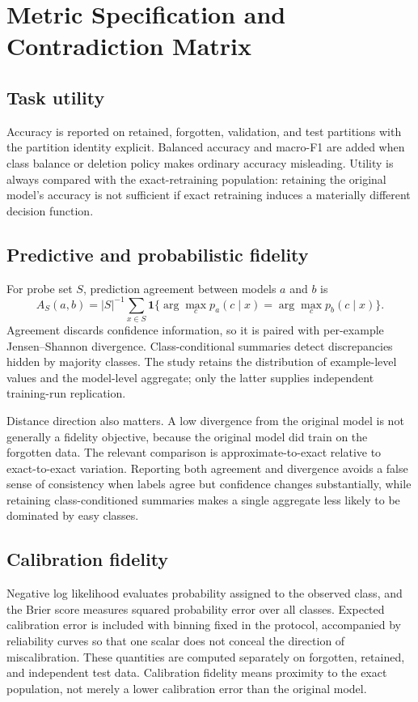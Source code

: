 \section{Metric Specification and Contradiction Matrix}
\subsection{Task utility}
Accuracy is reported on retained, forgotten, validation, and test partitions with the
partition identity explicit.  Balanced accuracy and macro-F1 are added when class balance
or deletion policy makes ordinary accuracy misleading.  Utility is always compared with
the exact-retraining population: retaining the original model's accuracy is not sufficient
if exact retraining induces a materially different decision function.

\subsection{Predictive and probabilistic fidelity}
For probe set $S$, prediction agreement between models $a$ and $b$ is
\begin{equation}
 A_S(a,b)=|S|^{-1}\sum_{x\in S}\mathbf{1}
 \{\arg\max_c p_a(c\mid x)=\arg\max_c p_b(c\mid x)\}.
\end{equation}
Agreement discards confidence information, so it is paired with per-example
Jensen--Shannon divergence.  Class-conditional summaries detect discrepancies hidden by
majority classes.  The study retains the distribution of example-level values and the
model-level aggregate; only the latter supplies independent training-run replication.

Distance direction also matters. A low divergence from the original model is not generally
a fidelity objective, because the original model did train on the forgotten data. The
relevant comparison is approximate-to-exact relative to exact-to-exact variation. Reporting
both agreement and divergence avoids a false sense of consistency when labels agree but
confidence changes substantially, while retaining class-conditioned summaries makes a
single aggregate less likely to be dominated by easy classes.

\subsection{Calibration fidelity}
Negative log likelihood evaluates probability assigned to the observed class, and the
Brier score measures squared probability error over all classes.  Expected calibration
error is included with binning fixed in the protocol, accompanied by reliability curves so
that one scalar does not conceal the direction of miscalibration.  These quantities are
computed separately on forgotten, retained, and independent test data.  Calibration
fidelity means proximity to the exact population, not merely a lower calibration error
than the original model.

